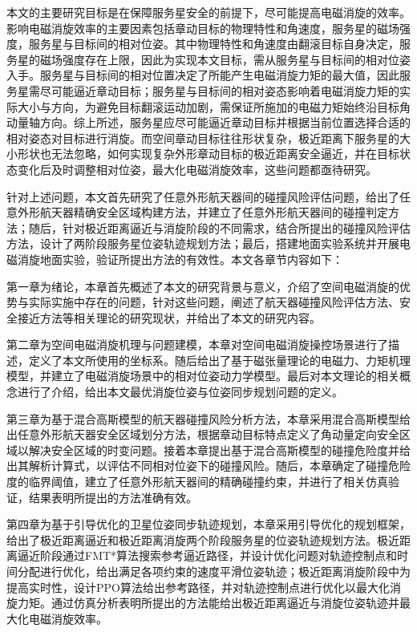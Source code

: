 \documentclass[lang=chs, degree=master, blindreview=false, winfonts=true]{yanputhesis}
\begin{document}
本文的主要研究目标是在保障服务星安全的前提下，尽可能提高电磁消旋的效率。影响电磁消旋效率的主要因素包括章动目标的物理特性和角速度，服务星的磁场强度，服务星与目标间的相对位姿。其中物理特性和角速度由翻滚目标自身决定，服务星的磁场强度存在上限，因此为实现本文目标，需从服务星与目标间的相对位姿入手。服务星与目标间的相对位置决定了所能产生电磁消旋力矩的最大值，因此服务星需尽可能逼近章动目标；服务星与目标间的相对姿态影响着电磁消旋力矩的实际大小与方向，为避免目标翻滚运动加剧，需保证所施加的电磁力矩始终沿目标角动量轴方向。综上所述，服务星应尽可能逼近章动目标并根据当前位置选择合适的相对姿态对目标进行消旋。而空间章动目标往往形状复杂，极近距离下服务星的大小形状也无法忽略，如何实现复杂外形章动目标的极近距离安全逼近，并在目标状态变化后及时调整相对位姿，最大化电磁消旋效率，这些问题都亟待研究。

针对上述问题，本文首先研究了任意外形航天器间的碰撞风险评估问题，给出了任意外形航天器精确安全区域构建方法，并建立了任意外形航天器间的碰撞判定方法；随后，针对极近距离逼近与消旋阶段的不同需求，结合所提出的碰撞风险评估方法，设计了两阶段服务星位姿轨迹规划方法；最后，搭建地面实验系统并开展电磁消旋地面实验，验证所提出方法的有效性。本文各章节内容如下：

第一章为绪论，本章首先概述了本文的研究背景与意义，介绍了空间电磁消旋的优势与实际实施中存在的问题，针对这些问题，阐述了航天器碰撞风险评估方法、安全接近方法等相关理论的研究现状，并给出了本文的研究内容。

第二章为空间电磁消旋机理与问题建模，本章对空间电磁消旋操控场景进行了描述，定义了本文所使用的坐标系。随后给出了基于磁张量理论的电磁力、力矩机理模型，并建立了电磁消旋场景中的相对位姿动力学模型。最后对本文理论的相关概念进行了介绍，给出本文最优消旋位姿与位姿同步规划问题的定义。

第三章为基于混合高斯模型的航天器碰撞风险分析方法，本章采用混合高斯模型给出任意外形航天器安全区域划分方法，根据章动目标特点定义了角动量定向安全区域以解决安全区域的时变问题。接着本章提出基于混合高斯模型的碰撞危险度并给出其解析计算式，以评估不同相对位姿下的碰撞风险。随后，本章确定了碰撞危险度的临界阈值，建立了任意外形航天器间的精确碰撞约束，并进行了相关仿真验证，结果表明所提出的方法准确有效。

第四章为基于引导优化的卫星位姿同步轨迹规划，本章采用引导优化的规划框架，给出了极近距离逼近和极近距离消旋两个阶段服务星的位姿轨迹规划方法。极近距离逼近阶段通过FMT*算法搜索参考逼近路径，并设计优化问题对轨迹控制点和时间分配进行优化，给出满足各项约束的速度平滑位姿轨迹；极近距离消旋阶段中为提高实时性，设计PPO算法给出参考路径，并对轨迹控制点进行优化以最大化消旋力矩。通过仿真分析表明所提出的方法能给出极近距离逼近与消旋位姿轨迹并最大化电磁消旋效率。
\end{document}
